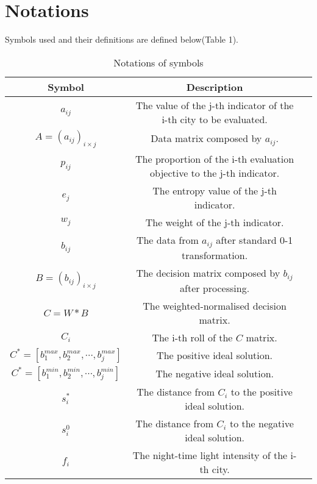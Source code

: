 \section{Notations}
Symbols used and their definitions are defined below(Table 1).
\begin{table}[h] \centering
    \caption{Notations of symbols}
    \begin{tabular}{ccl}
        \toprule
        Symbol & Description\\ \hline
        $a_{ij}$ & The value of the j-th indicator of the i-th city to be evaluated. \\
        $A=(a_{ij})_{i\times j}$ & Data matrix composed by $a_{ij}$. \\
        $p_{ij}$ & The proportion of the i-th evaluation objective to the j-th indicator. \\
        $e_j$ & The entropy value of the j-th indicator. \\
        $w_j$ & The weight of the j-th indicator. \\
        $b_{ij}$ & The data from $a_{ij}$ after standard 0-1 transformation.\\
        $B=(b_{ij})_{i\times j}$ & The decision matrix composed by $b_{ij}$ after processing.\\
        $C=W*B$ & The weighted-normalised decision matrix. \\
        $C_i$ & The i-th roll of the $C$ matrix. \\
        $C^*=[b_1^{max},b_2^{max},\cdots,b_j^{max}]$ & The positive ideal solution. \\
        $C^*=[b_1^{min},b_2^{min},\cdots,b_j^{min}]$ & The negative ideal solution. \\
        $s_i^*$ & The distance from $C_i$ to the positive ideal solution. \\
        $s_i^0$ & The distance from $C_i$ to the negative ideal solution. \\
        $f_i$ & The night-time light intensity of the i-th city. \\
        \bottomrule
    \end{tabular}
\end{table}
